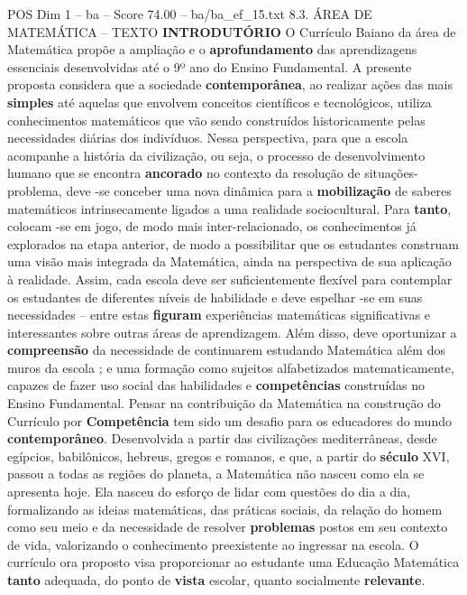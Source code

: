 \begin{textsample}{POS Dim 1 – ba – Score 74.00 – ba/ba\_ef\_15.txt}  \label{ex:f1_pos_102}
8.3.
ÁREA DE MATEMÁTICA – TEXTO \textbf{INTRODUTÓRIO} O Currículo Baiano da área de Matemática propõe a ampliação e o \textbf{aprofundamento} das aprendizagens essenciais desenvolvidas até o 9º ano do Ensino Fundamental.
A presente proposta considera que a sociedade \textbf{contemporânea}, ao realizar ações das mais \textbf{simples} até aquelas que envolvem conceitos científicos e tecnológicos, utiliza conhecimentos matemáticos que vão sendo construídos historicamente pelas necessidades diárias dos indivíduos.
Nessa perspectiva, para que a escola acompanhe a história da civilização, ou seja, o processo de desenvolvimento humano que se encontra \textbf{ancorado} no contexto da resolução de situações-problema, deve -se conceber uma nova dinâmica para a \textbf{mobilização} de saberes matemáticos intrinsecamente ligados a uma realidade sociocultural.
Para \textbf{tanto}, colocam -se em jogo, de modo mais inter-relacionado, os conhecimentos já explorados na etapa anterior, de modo a possibilitar que os estudantes construam uma visão mais integrada da Matemática, ainda na perspectiva de sua aplicação à realidade.
Assim, cada escola deve ser suficientemente flexível para contemplar os estudantes de diferentes níveis de habilidade e deve espelhar -se em suas necessidades – entre estas \textbf{figuram} experiências matemáticas significativas e interessantes sobre outras áreas de aprendizagem.
Além disso, deve oportunizar a \textbf{compreensão} da necessidade de continuarem estudando Matemática além dos muros da escola ; e uma formação como sujeitos alfabetizados matematicamente, capazes de fazer uso social das habilidades e \textbf{competências} construídas no Ensino Fundamental.
Pensar na contribuição da Matemática na construção do Currículo por \textbf{Competência} tem sido um desafio para os educadores do mundo \textbf{contemporâneo}.
Desenvolvida a partir das civilizações mediterrâneas, desde egípcios, babilônicos, hebreus, gregos e romanos, e que, a partir do \textbf{século} XVI, passou a todas as regiões do planeta, a Matemática não nasceu como ela se apresenta hoje.
Ela nasceu do esforço de lidar com questões do dia a dia, formalizando as ideias matemáticas, das práticas sociais, da relação do homem como seu meio e da necessidade de resolver \textbf{problemas} postos em seu contexto de vida, valorizando o conhecimento preexistente ao ingressar na escola.
O currículo ora proposto visa proporcionar ao estudante uma Educação Matemática \textbf{tanto} adequada, do ponto de \textbf{vista} escolar, quanto socialmente \textbf{relevante}.

\end{textsample}
